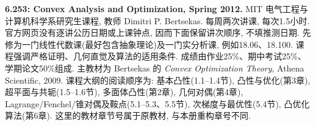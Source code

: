 \clearpage
{}
\par

\noindent\textbf{6.253: Convex Analysis and Optimization, Spring 2012.}
MIT 电气工程与计算机科学系研究生课程, 教师 Dimitri P. Bertsekas.
每周两次讲课, 每次1.5小时. 官方网页没有逐讲公历日期或上课钟点, 因而下面保留讲次顺序, 不填推测日期.
先修为一门线性代数课(最好包含抽象理论)及一门实分析课, 例如18.06、18.100.
课程强调严格证明、几何直觉及算法的适用条件. 成绩由作业25\%、期中考试25\%、学期论文50\%组成.
主教材为 Bertsekas 的 \emph{Convex Optimization Theory}, Athena Scientific, 2009.
课程大纲的阅读顺序为: 基本凸性(1.1--1.4节), 凸性与优化(第3章), 超平面与共轭(1.5--1.6节), 多面体凸性(第2章), 几何对偶(第4章), Lagrange/Fenchel/锥对偶及鞍点(5.1--5.3、5.5节), 次梯度与最优性(5.4节), 凸优化算法(第6章).
这里的教材章节号属于原教材, 与本册重构章号不同.

